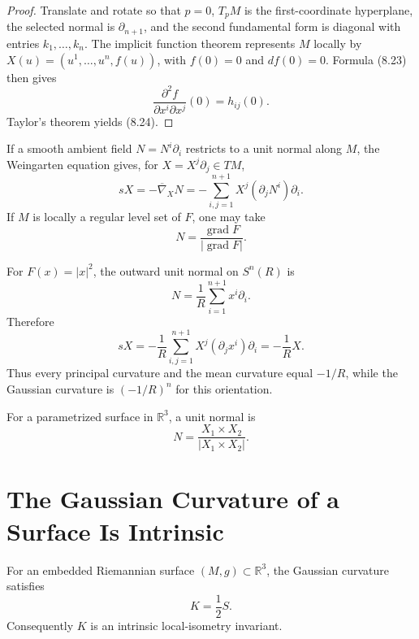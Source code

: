 \begin{proof}
\sketch
Translate and rotate so that $p=0$, $T_pM$ is the first-coordinate
hyperplane, the selected normal is $\partial_{n+1}$, and the second
fundamental form is diagonal with entries $k_1,\ldots,k_n$.  The implicit
function theorem represents $M$ locally by
$X(u)=(u^1,\ldots,u^n,f(u))$, with $f(0)=0$ and $df(0)=0$.  Formula (8.23)
then gives
\[
\frac{\partial^2f}{\partial x^i\partial x^j}(0)=h_{ij}(0).
\]
Taylor's theorem yields (8.24).
\end{proof}

If a smooth ambient field $N=N^i\partial_i$ restricts to a unit normal along
$M$, the Weingarten equation gives, for
$X=X^j\partial_j\in TM$,
\begin{equation}
sX=-\overline\nabla_XN
=-\sum_{i,j=1}^{n+1}X^j(\partial_jN^i)\partial_i. \tag{8.25}
\end{equation}
If $M$ is locally a regular level set of $F$, one may take
\[
N=\frac{\operatorname{grad}F}{|\operatorname{grad}F|}.
\]

\begin{example}
\label{ex:shape-operators-spheres}

For $F(x)=|x|^2$, the outward unit normal on $S^n(R)$ is
\[
N=\frac1R\sum_{i=1}^{n+1}x^i\partial_i.
\]
Therefore
\[
sX=-\frac1R\sum_{i,j=1}^{n+1}X^j(\partial_jx^i)\partial_i
=-\frac1RX.
\]
Thus every principal curvature and the mean curvature equal $-1/R$, while
the Gaussian curvature is $(-1/R)^n$ for this orientation.
\end{example}

For a parametrized surface in $\mathbb R^3$, a unit normal is
\begin{equation}
N=\frac{X_1\times X_2}{|X_1\times X_2|}. \tag{8.26}
\end{equation}

\section{The Gaussian Curvature of a Surface Is Intrinsic}

\begin{theorem}
\label{thm:theorema-egregium}

For an embedded Riemannian surface $(M,g)\subset\mathbb R^3$, the Gaussian
curvature satisfies
\[
K=\frac12S.
\]
Consequently $K$ is an intrinsic local-isometry invariant.
\end{theorem}

